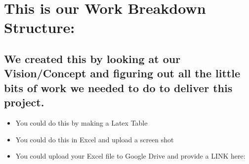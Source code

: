 \section{This is our Work Breakdown Structure:}
\subsection{We created this by looking at our Vision/Concept and figuring out all the little bits of work we needed to do to deliver this project.}

\begin{itemize}
    \item You could do this by making a Latex Table
    \item You could do this in Excel and upload a screen shot
    \item You could upload your Excel file to Google Drive and provide a LINK here:
    
    
\end{itemize}